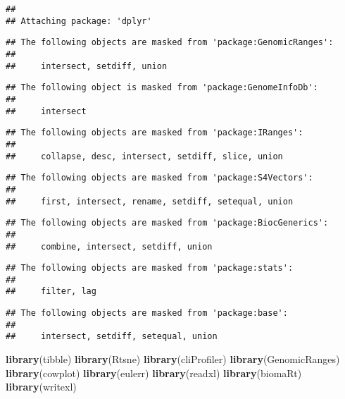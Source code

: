 \documentclass[
]{article}
\newenvironment{Shaded}{\begin{snugshade}}{\end{snugshade}}
\newcommand{\FunctionTok}[1]{\textcolor[rgb]{0.13,0.29,0.53}{\textbf{#1}}}
\newcommand{\NormalTok}[1]{#1}
\begin{document}
\begin{verbatim}
## 
## Attaching package: 'dplyr'
\end{verbatim}

\begin{verbatim}
## The following objects are masked from 'package:GenomicRanges':
## 
##     intersect, setdiff, union
\end{verbatim}

\begin{verbatim}
## The following object is masked from 'package:GenomeInfoDb':
## 
##     intersect
\end{verbatim}

\begin{verbatim}
## The following objects are masked from 'package:IRanges':
## 
##     collapse, desc, intersect, setdiff, slice, union
\end{verbatim}

\begin{verbatim}
## The following objects are masked from 'package:S4Vectors':
## 
##     first, intersect, rename, setdiff, setequal, union
\end{verbatim}

\begin{verbatim}
## The following objects are masked from 'package:BiocGenerics':
## 
##     combine, intersect, setdiff, union
\end{verbatim}

\begin{verbatim}
## The following objects are masked from 'package:stats':
## 
##     filter, lag
\end{verbatim}

\begin{verbatim}
## The following objects are masked from 'package:base':
## 
##     intersect, setdiff, setequal, union
\end{verbatim}

\begin{Shaded}
\begin{Highlighting}[]
\FunctionTok{library}\NormalTok{(tibble)}
\FunctionTok{library}\NormalTok{(Rtsne)}
\FunctionTok{library}\NormalTok{(cliProfiler)}
\FunctionTok{library}\NormalTok{(GenomicRanges)}
\FunctionTok{library}\NormalTok{(cowplot)}
\FunctionTok{library}\NormalTok{(eulerr)}
\FunctionTok{library}\NormalTok{(readxl)}
\FunctionTok{library}\NormalTok{(biomaRt)}
\FunctionTok{library}\NormalTok{(writexl)}
\end{Highlighting}
\end{Shaded}
\end{document}
